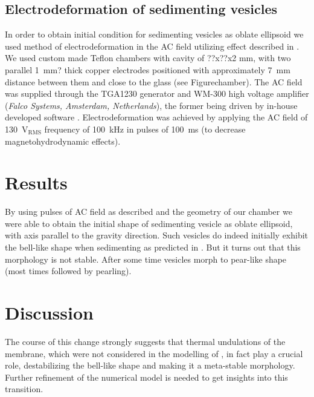 \documentclass[10pt,a4paper,draft]{article}
\begin{document}
\subsection{Electrodeformation of sedimenting vesicles}
In order to obtain initial condition for sedimenting vesicles as oblate ellipsoid we used method of electrodeformation in the AC field utilizing effect described in \cite{Aranda2008}.
We used custom made Teflon chambers with cavity of ??x??x2 mm, with two parallel 1~mm{?} thick copper electrodes positioned with approximately 7~mm distance between them and close to the glass (see Figure{chamber}). The AC field was supplied through the TGA1230 generator and WM-300 high voltage amplifier (\emph{Falco Systems, Amsterdam, Netherlands}), the former being driven by in-house developed software \cite{pufuncgen}.
Electrodeformation was achieved by applying the AC field of 130~V$_\mathrm{RMS}$ frequency of 100~kHz in pulses of 100~ms (to decrease magnetohydrodynamic effects).

\section{Results}\label{results}
By using pulses of AC field as described and the geometry of our chamber we were able to obtain the initial shape of sedimenting vesicle as oblate ellipsoid, with axis parallel to the gravity direction.
Such vesicles do indeed initially exhibit the bell-like shape when sedimenting as predicted in \cite{Boedec2012}.
But it turns out that this morphology is not stable. After some time vesicles morph to pear-like shape (most times followed by pearling).

\section{Discussion}\label{discussion}
The course of this change strongly suggests that thermal undulations of the membrane, which were not considered in the modelling of \cite{Boedec2012}, in fact play a crucial role, destabilizing the bell-like shape and making it a meta-stable morphology. Further refinement of the numerical model is needed to get insights into this transition.


\end{document}
